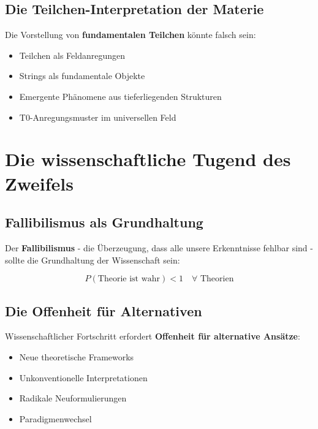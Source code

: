 \documentclass[12pt,a4paper]{report}
\begin{document}
	\subsection{Die Teilchen-Interpretation der Materie}
	
	Die Vorstellung von \textbf{fundamentalen Teilchen} könnte falsch sein:
	
	\begin{itemize}
		\item Teilchen als Feldanregungen
		\item Strings als fundamentale Objekte
		\item Emergente Phänomene aus tieferliegenden Strukturen
		\item T0-Anregungsmuster im universellen Feld
	\end{itemize}
	
	\section{Die wissenschaftliche Tugend des Zweifels}
	
	\subsection{Fallibilismus als Grundhaltung}
	
	Der \textbf{Fallibilismus} - die Überzeugung, dass alle unsere Erkenntnisse fehlbar sind - sollte die Grundhaltung der Wissenschaft sein:
	
	\begin{equation}
		P(\text{Theorie ist wahr}) < 1 \quad \forall \text{ Theorien}
	\end{equation}
	
	\subsection{Die Offenheit für Alternativen}
	
	Wissenschaftlicher Fortschritt erfordert \textbf{Offenheit für alternative Ansätze}:
	
	\begin{itemize}
		\item Neue theoretische Frameworks
		\item Unkonventionelle Interpretationen
		\item Radikale Neuformulierungen
		\item Paradigmenwechsel
	\end{itemize}
	
\end{document}
